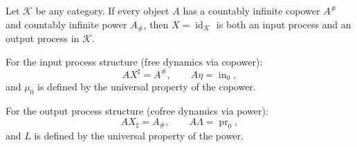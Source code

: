 Let $\mathcal{K}$ be any category. If every object $A$ has a countably infinite copower $A^{\#}$ and countably infinite power $A_{\#}$, then $X = \operatorname{id}_{\mathcal{K}}$ is both an input process and an output process in $\mathcal{K}$.

For the input process structure (free dynamics via copower):
$$AX^{\sharp} = A^{\#}, \qquad A\eta = \operatorname{in}_0,$$
and $\mu_0$ is defined by the universal property of the copower.

For the output process structure (cofree dynamics via power):
$$AX_{\sharp} = A_{\#}, \qquad A\Lambda = \operatorname{pr}_0,$$
and $L$ is defined by the universal property of the power.
